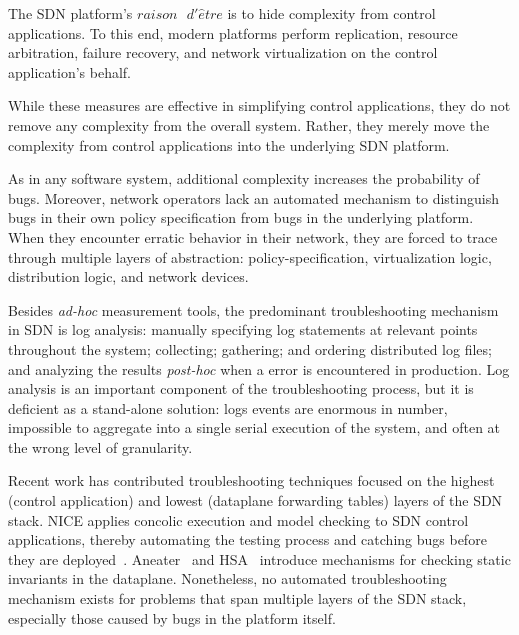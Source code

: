 The SDN platform's $raison\text{ }d'\hat{e}tre$ is to 
hide complexity from control applications. To this end, modern platforms perform
replication, resource arbitration, failure recovery, and network 
virtualization on the control application's behalf. 

While these measures are effective in simplifying control applications,
they do not remove any complexity from the overall system. Rather, they merely move the complexity
from control applications into the underlying SDN platform.

As in any software system, additional complexity increases the probability of
bugs. Moreover, network operators lack an automated mechanism to
distinguish bugs in their own policy specification from bugs in the underlying
platform. When they encounter erratic behavior in their network,
they are forced to trace through
multiple layers of abstraction: policy-specification, virtualization logic, distribution logic, and
network devices.

Besides {\it ad-hoc} measurement tools,
the predominant troubleshooting mechanism in SDN is
log analysis: manually specifying log statements at relevant points throughout the system;
collecting; gathering; and ordering distributed log files; and analyzing the
results {\it post-hoc} when a error is encountered in production. Log analysis
is an important component of the troubleshooting process, but it is deficient
as a stand-alone solution: logs events
are enormous in number, impossible to aggregate into a single serial
execution of the system, and often at the wrong level of granularity.

Recent work has contributed troubleshooting techniques focused on the highest (control
application) and lowest (dataplane forwarding tables) layers of the SDN stack.
NICE applies concolic execution and model checking to SDN control
applications, thereby automating the testing process and catching bugs before
they are deployed~\cite{nice}. Aneater~\cite{anteater} and HSA~\cite{hsa}
introduce mechanisms for checking static invariants in the dataplane.
Nonetheless, no automated troubleshooting mechanism exists for problems that span
multiple layers of the SDN stack, especially those caused by bugs in the platform
itself.


